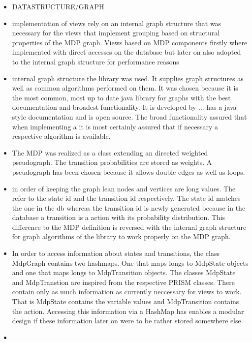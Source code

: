 \documentclass[preview]{standalone}
\begin{document}
\begin{itemize}
		
		\item DATASTRUCTURE/GRAPH
		\item implementation of views rely on an internal graph structure that was necessary for the views that implement grouping based on structural properties of the MDP graph. Views based on MDP components firstly where implemented with direct accesses on the database but later on also adopted to the internal graph structure for performance reasons
		\item internal graph structure the \jgrapht library was used. It supplies graph structures as well as common algorithms performed on them. It was chosen because it is the most common, most up to date java library for graphs with the best documentation and broadest functionality. It is developed by ... has a java style documentation and is open source. The broad functionality assured that when implementing a \viewN it is most certainly assured that if necessary a respective algorithm is available.
		\item The MDP was realized as a class extending an directed weighted pseudograph. The transition probabilities are stored as weights. A pseudograph has been chosen because it allows double edges as well as loops.	
		\item in order of keeping the graph lean nodes and vertices are long values. The refer to the state id and the transition id respectively. The state id matches the one in the db whereas the transition id is newly generated because in the database a transition is a action with its probability distribution. This difference to the MDP definition is reversed with the internal graph structure for graph algorithms of the \jgrapht library to work properly on the MDP graph.
		\item In order to access information about states and transitions, the class MdpGraph contains two hashmaps. One that maps longs to MdpState objects and one that maps longs to MdpTransition objects. The classes MdpState and MdpTranstion are inspired from the respective PRISM classes. There contain only as much information as currently neccessary for views to work. That is MdpState contains the variable values and MdpTransition contains the action. Accessing this information via a HashMap has enables a modular design if these information later on were to be rather stored somewhere else.
		
		\item {}
		
	\end{itemize}
\end{document}

